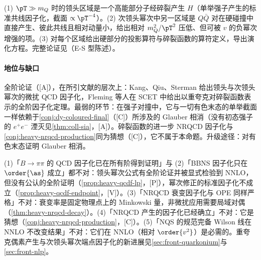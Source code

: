 \begin{proofsketch}
(1) $\pT\gg m_Q$ 时的领头区域是一个高能部分子经碎裂产生 $H$（单举强子产生的标准共线因子化，截面 $\propto\pT^{-4}$）。(2) 次领头幂次中另一区域是 $Q\bar Q$ 对在硬碰撞中直接产生、彼此共线且相对动量小，给出相对 $m_Q^2/\pT^2$ 压低、但可被 $v$ 的负幂次增强的项\cite{Fleming:2012wy}。(3) 对每个区域给出硬部分的投影算符与碎裂函数的算符定义，导出演化方程。完整论证见\cite{Kang:2011mg,Kang:2014tta,Fleming:2012wy}（E-S 型陈述）。
\end{proofsketch}

\paragraph{地位与缺口}
全阶论证（[A]），在所引文献的层次上：Kang、Qiu、Sterman 给出领头与次领头幂次的微扰 QCD 因子化\cite{Kang:2011mg}，Fleming 等人在 SCET 中给出以重夸克对碎裂函数表示的全阶因子化定理\cite{Fleming:2012wy}。最弱的环节：在强子对撞中，它与一切有色末态的单举截面一样依赖于\cref{conj:dy-coloured-final}（[C]）所涉及的 Glauber 相消（没有初态强子的 $e^+e^-$ 湮灭见\cref{thm:coll-sia}，[A]）。碎裂函数的进一步 NRQCD 因子化与\cref{conj:heavy-nrqcd-production}同为猜想（[C]），它不属于本命题。升级途径：对有色末态证明 Glauber 相消。

\begin{remark}[常见误解]\label{rem:heavy-misconceptions}
(1)「$B\to\pi\pi$ 的 QCD 因子化已在所有阶得到证明」与 (2)「BBNS 因子化只在 $\order{\as}$ 成立」都不对：领头幂次公式有全阶论证并被显式检验到 NNLO，但没有公认的全阶证明（\cref{prop:heavy-qcdf-lp}，[P]），幂次修正的标准因子化不成立（\cref{prop:heavy-qcdf-endpoint}，[V]）。(3)「NRQCD 衰变因子化与 OPE 同样严格」不对：衰变率是固定物理点上的 Minkowski 量，非微扰应用需要局域对偶（\cref{thm:heavy-nrqcd-decay}）。(4)「NRQCD 产生的因子化已经确立」不对：它是猜想（\cref{conj:heavy-nrqcd-production}，[C]）。(5)「NQS 的规范完备 Wilson 线在 NNLO 不改变结果」不对：它们在 NNLO（相对 $\order{v^2}$）是必需的。重夸克偶素产生与次领头幂次端点因子化的新进展见\cref{sec:front-quarkonium}与\cref{sec:front-nlp}。
\end{remark}
